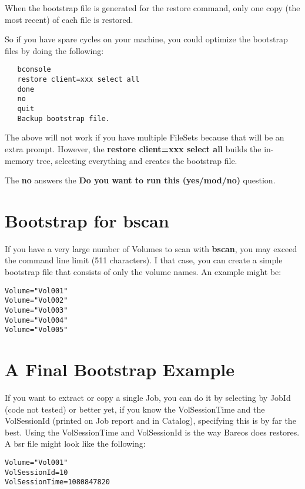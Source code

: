 When the bootstrap file is generated for the restore command, only one copy
(the most recent) of each file is restored.

So if you have spare cycles on your machine, you could optimize the bootstrap
files by doing the following:

\footnotesize
\begin{verbatim}
   bconsole
   restore client=xxx select all
   done
   no
   quit
   Backup bootstrap file.
\end{verbatim}
\normalsize

The above will not work if you have multiple FileSets because that will be an
extra prompt. However, the {\bf restore client=xxx select all} builds the
in-memory tree, selecting everything and creates the bootstrap file.

The {\bf no} answers the {\bf Do you want to run this (yes/mod/no)} question.

\label{bscanBootstrap}
\section{Bootstrap for bscan}
If you have a very large number of Volumes to scan with {\bf bscan},
you may exceed the command line limit (511 characters). I that case,
you can create a simple bootstrap file that consists of only the
volume names.  An example might be:

\footnotesize
\begin{verbatim}
Volume="Vol001"
Volume="Vol002"
Volume="Vol003"
Volume="Vol004"
Volume="Vol005"
\end{verbatim}
\normalsize


\section{A Final Bootstrap Example}

If you want to extract or copy a single Job, you can do it by selecting by
JobId (code not tested) or better yet, if you know the VolSessionTime and the
VolSessionId (printed on Job report and in Catalog), specifying this is by far
the best. Using the VolSessionTime and VolSessionId is the way Bareos does
restores. A bsr file might look like the following:

\footnotesize
\begin{verbatim}
Volume="Vol001"
VolSessionId=10
VolSessionTime=1080847820
\end{verbatim}
\normalsize

